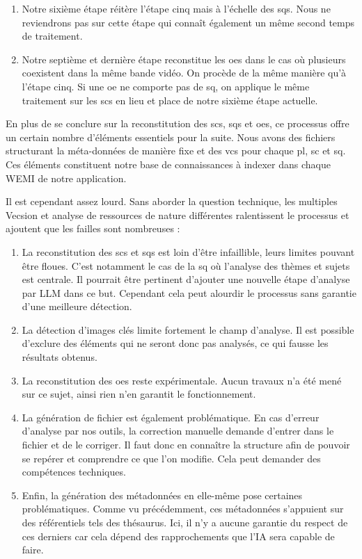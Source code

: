 \begin{enumerate}
	\item Notre sixième étape réitère l'étape cinq mais à l'échelle des \glspl{sq}. Nous ne reviendrons pas sur cette étape qui connaît également un même second temps de traitement.
	
	\item Notre septième et dernière étape reconstitue les \glspl{oe} dans le cas où plusieurs coexistent dans la même bande vidéo. On procède de la même manière qu'à l'étape cinq. Si une \gls{oe} ne comporte pas de \gls{sq}, on applique le même traitement sur les \glspl{sc} en lieu et place de notre sixième étape actuelle.
\end{enumerate}

En plus de se conclure sur la reconstitution des \glspl{sc}, \glspl{sq} et \glspl{oe}, ce processus offre un certain nombre d'éléments essentiels pour la suite. Nous avons des fichiers \J structurant la méta-données de manière fixe et des \gls{vcs} pour chaque \gls{pl}, \gls{sc} et \gls{sq}. Ces éléments constituent notre base de connaissances à indexer dans chaque \gls{WEMI} de notre application.

Il est cependant assez lourd. Sans aborder la question technique, les multiples \gls{Vecsion} et analyse de ressources de nature différentes ralentissent le processus et ajoutent que les failles sont nombreuses : 

\begin{enumerate}
	
	\item La reconstitution des \glspl{sc} et \glspl{sq} est loin d'être infaillible, leurs limites pouvant être floues. C'est notamment le cas de la \gls{sq} où l'analyse des thèmes et sujets est centrale. Il pourrait être pertinent d'ajouter une nouvelle étape d'analyse par \gls{LLM} dans ce but. Cependant cela peut alourdir le processus sans garantie d'une meilleure détection. 

	\item La détection d'images clés limite fortement le champ d'analyse. Il est possible d'exclure des éléments qui ne seront donc pas analysés, ce qui fausse les résultats obtenus.
	
	\item La reconstitution des \glspl{oe} reste expérimentale. Aucun travaux n'a été mené sur ce sujet, ainsi rien n'en garantit le fonctionnement.
	
	\item La génération de fichier \J est également problématique. En cas d'erreur d'analyse par nos outils, la correction manuelle demande d'entrer dans le fichier \J et de le corriger. Il faut donc en connaître la structure afin de pouvoir se repérer et comprendre ce que l'on modifie. Cela peut demander des compétences techniques.
	
	\item Enfin, la génération des métadonnées en elle-même pose certaines problématiques. Comme vu précédemment, ces métadonnées s'appuient sur des référentiels tels des thésaurus. Ici, il n'y a aucune garantie du respect de ces derniers car cela dépend des rapprochements que l'\gls{IA} sera capable de faire.
\end{enumerate}

